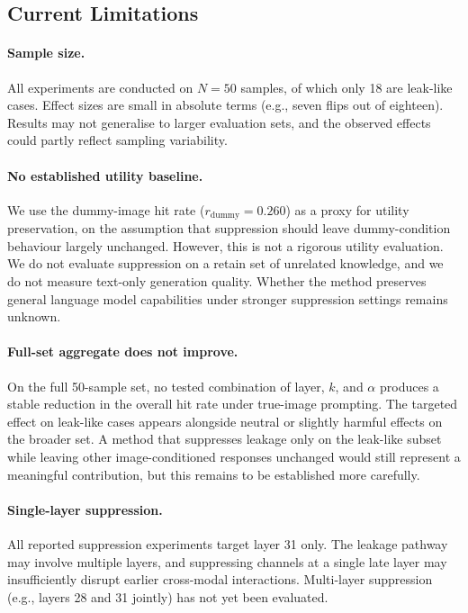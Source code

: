 \documentclass[12pt, a4paper]{article}
\begin{document}
\subsection{Current Limitations}

\paragraph{Sample size.}
All experiments are conducted on $N = 50$ samples, of which only 18 are leak-like
cases.
Effect sizes are small in absolute terms (e.g., seven flips out of eighteen).
Results may not generalise to larger evaluation sets, and the observed effects could
partly reflect sampling variability.

\paragraph{No established utility baseline.}
We use the dummy-image hit rate ($r_{\text{dummy}} = 0.260$) as a proxy for utility
preservation, on the assumption that suppression should leave dummy-condition behaviour
largely unchanged.
However, this is not a rigorous utility evaluation.
We do not evaluate suppression on a retain set of unrelated knowledge, and we do not
measure text-only generation quality.
Whether the method preserves general language model capabilities under stronger
suppression settings remains unknown.

\paragraph{Full-set aggregate does not improve.}
On the full 50-sample set, no tested combination of layer, $k$, and $\alpha$ produces
a stable reduction in the overall hit rate under true-image prompting.
The targeted effect on leak-like cases appears alongside neutral or slightly harmful
effects on the broader set.
A method that suppresses leakage only on the leak-like subset while leaving other
image-conditioned responses unchanged would still represent a meaningful contribution,
but this remains to be established more carefully.

\paragraph{Single-layer suppression.}
All reported suppression experiments target layer 31 only.
The leakage pathway may involve multiple layers, and suppressing channels at a single
late layer may insufficiently disrupt earlier cross-modal interactions.
Multi-layer suppression (e.g., layers 28 and 31 jointly) has not yet been evaluated.
\end{document}
